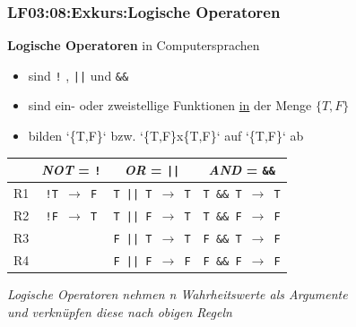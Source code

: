 \begin{frame}[fragile]  
  \frametitle{LF03:08:Exkurs:Logische Operatoren}
  \vspace{0.2cm}

  \begin{small}
  \textbf{Logische Operatoren} in Computersprachen
  \begin{itemize}
    \item sind \texttt{!} , \texttt{||} und \texttt{\&\&} 
    \item sind ein- oder zweistellige Funktionen \underline{in} der Menge $\{T,F\}$
    \item bilden `\{T,F\}` bzw. `\{T,F\}x\{T,F\}` auf `\{T,F\}` ab
  \end{itemize}
    
  \vspace{0.2cm}
  \begin{center}

      \renewcommand{\arraystretch}{1.3}
\begin{tabular}{c|c|c|c|}
  & \textit{NOT} = \texttt{!} & \textit{OR} = \texttt{||} & \textit{AND} = \texttt{\&\&} \\
  \hline
  R1 & \texttt{!T $\rightarrow$ F} & \texttt{T || T $\rightarrow$ T} & \texttt{T \&\& T $\rightarrow$ T} \\
  \hline
  R2 & \texttt{!F $\rightarrow$ T} & \texttt{T || F $\rightarrow$ T} & \texttt{T \&\& F $\rightarrow$ F} \\
  \hline
  R3 &  & \texttt{F || T $\rightarrow$ T} & \texttt{F \&\& T $\rightarrow$ F} \\
  \hline
  R4 &  & \texttt{F || F $\rightarrow$ F} & \texttt{F \&\& F $\rightarrow$ F} \\

\end{tabular}
    \end{center}
  \end{small}
  
  \vspace{0.5cm}
\begin{footnotesize}
    \begin{flushright}
      \textit{Logische Operatoren nehmen n Wahrheitswerte als Argumente \\
      und verknüpfen diese nach obigen Regeln}
    \end{flushright}
  \end{footnotesize}

\end{frame}

